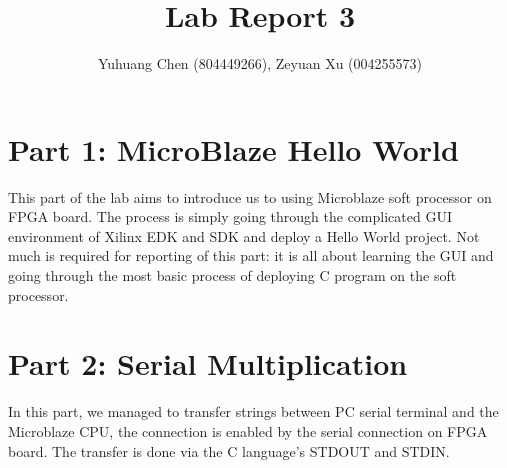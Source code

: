 \documentclass{article}
\title{Lab Report 3}
\author{Yuhuang Chen (804449266), Zeyuan Xu (004255573)}
\date{}
\begin{document}
  \maketitle%
  \thispagestyle{empty}

\section{Part 1: MicroBlaze Hello World}
This part of the lab aims to introduce us to using Microblaze soft processor on FPGA board. The process is simply going through the complicated GUI environment of Xilinx EDK and SDK and deploy a Hello World project. Not much is required for reporting of this part: it is all about learning the GUI and going through the most basic process of deploying C program on the soft processor. 

\section{Part 2: Serial Multiplication}
In this part, we managed to transfer strings between PC serial terminal and the Microblaze CPU, the connection is enabled by the serial connection on FPGA board. The transfer is done via the C language's STDOUT and STDIN. 
\end{document}
